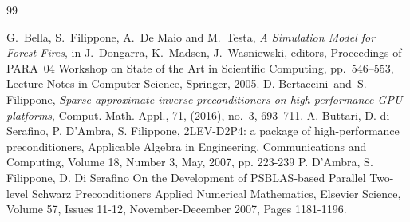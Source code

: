 
\begin{thebibliography}{99}

G.~Bella, S.~Filippone, A.~De Maio and M.~Testa,
{\em A Simulation Model for Forest Fires},
in J.~Dongarra, K.~Madsen, J.~Wasniewski, editors,
Proceedings of PARA~04 Workshop on State of the Art
in Scientific Computing, pp.~546--553, Lecture Notes in Computer Science,
Springer, 2005.
D. Bertaccini\ and\ S. Filippone, 
{\em Sparse approximate inverse preconditioners on high performance GPU platforms}, 
Comput. Math. Appl.,  71, (2016), no.~3, 693--711.
%
 A. Buttari, D. di Serafino, P. D'Ambra, S. Filippone,\newblock
2LEV-D2P4: a package of high-performance preconditioners,\newblock
Applicable Algebra in Engineering, Communications and Computing, 
Volume 18, Number 3, May, 2007, pp.  223-239
%
  P. D'Ambra, S. Filippone,  D. Di Serafino\newblock
On the Development of PSBLAS-based Parallel Two-level Schwarz Preconditioners
\newblock
Applied Numerical Mathematics, Elsevier Science, 
Volume 57, Issues 11-12, November-December 2007, Pages 1181-1196.


\end{thebibliography}
